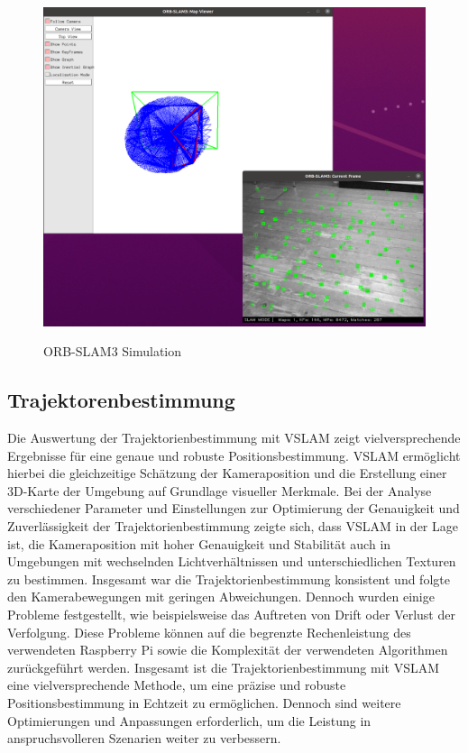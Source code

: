 \begin{figure}
    \includegraphics[width=\textwidth]{images/orbslam3_simulation}
    \label{fig:orbslam3}
    \caption{ORB-SLAM3 Simulation}
\end{figure}

\subsection{Trajektorenbestimmung}
Die Auswertung der Trajektorienbestimmung mit \ac{VSLAM} zeigt vielversprechende Ergebnisse für eine genaue und robuste Positionsbestimmung. \ac{VSLAM} ermöglicht hierbei die gleichzeitige Schätzung der Kameraposition und die Erstellung einer 3D-Karte der Umgebung auf Grundlage visueller Merkmale. Bei der Analyse verschiedener Parameter und Einstellungen zur Optimierung der Genauigkeit und Zuverlässigkeit der Trajektorienbestimmung zeigte sich, dass \ac{VSLAM} in der Lage ist, die Kameraposition mit hoher Genauigkeit und Stabilität auch in Umgebungen mit wechselnden Lichtverhältnissen und unterschiedlichen Texturen zu bestimmen. Insgesamt war die Trajektorienbestimmung konsistent und folgte den Kamerabewegungen mit geringen Abweichungen. Dennoch wurden einige Probleme festgestellt, wie beispielsweise das Auftreten von Drift oder Verlust der Verfolgung. Diese Probleme können auf die begrenzte Rechenleistung des verwendeten Raspberry Pi sowie die Komplexität der verwendeten Algorithmen zurückgeführt werden. Insgesamt ist die Trajektorienbestimmung mit \ac{VSLAM} eine vielversprechende Methode, um eine präzise und robuste Positionsbestimmung in Echtzeit zu ermöglichen. Dennoch sind weitere Optimierungen und Anpassungen erforderlich, um die Leistung in anspruchsvolleren Szenarien weiter zu verbessern.
